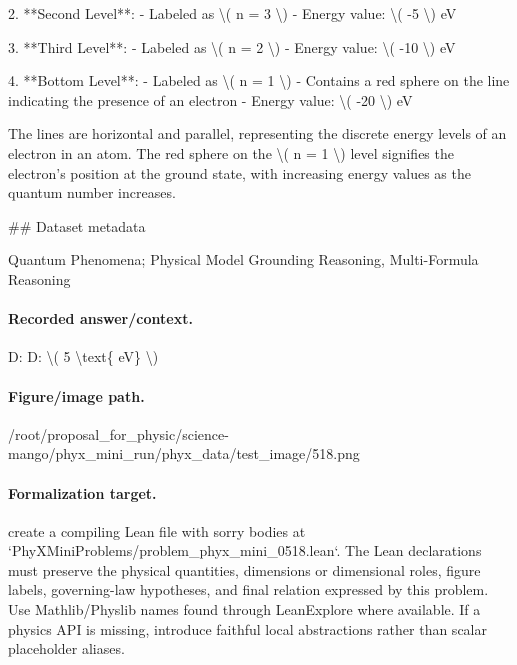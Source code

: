 2. **Second Level**:
   - Labeled as \textbackslash{}( n = 3 \textbackslash{})
   - Energy value: \textbackslash{}( -5 \textbackslash{}) eV

3. **Third Level**:
   - Labeled as \textbackslash{}( n = 2 \textbackslash{})
   - Energy value: \textbackslash{}( -10 \textbackslash{}) eV

4. **Bottom Level**:
   - Labeled as \textbackslash{}( n = 1 \textbackslash{})
   - Contains a red sphere on the line indicating the presence of an electron 
   - Energy value: \textbackslash{}( -20 \textbackslash{}) eV

The lines are horizontal and parallel, representing the discrete energy levels of an electron in an atom. The red sphere on the \textbackslash{}( n = 1 \textbackslash{}) level signifies the electron's position at the ground state, with increasing energy values as the quantum number increases.

\#\# Dataset metadata

Quantum Phenomena; Physical Model Grounding Reasoning, Multi-Formula Reasoning

\paragraph{Recorded answer/context.}
D: D: \textbackslash{}( 5 \textbackslash{}text\{ eV\} \textbackslash{})

\paragraph{Figure/image path.}
/root/proposal\_for\_physic/science-mango/phyx\_mini\_run/phyx\_data/test\_image/518.png

\paragraph{Formalization target.}
create a compiling Lean file with sorry bodies at `PhyXMiniProblems/problem\_phyx\_mini\_0518.lean`. The Lean declarations must preserve the physical quantities, dimensions or dimensional roles, figure labels, governing-law hypotheses, and final relation expressed by this problem.
Use Mathlib/Physlib names found through LeanExplore where available. If a physics API is missing, introduce faithful local abstractions rather than scalar placeholder aliases.


